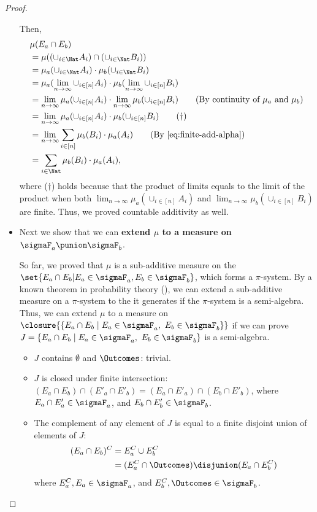 \documentclass[acmsmall,nonacm,screen,appendix]{acmart}
\begin{document}
\begin{proof}
\begin{itemize}
Then,
  \begin{align}
   &\mu(E_a \cap E_b) \notag \\
   &= \mu((\cup_{i \in \Nat} A_i) \cap (\cup_{i \in \Nat} B_i)) \notag \\
   &= \mu_a(\cup_{i \in \Nat} A_i) \cdot \mu_b(\cup_{i \in \Nat} B_i) \notag \\
   &= \mu_a(\lim_{n \to \infty} \cup_{i \in [n]} A_i) \cdot \mu_b(\lim_{n \to \infty} \cup_{i \in [n]} B_i) \notag \\
   &= \lim_{n \to \infty} \mu_a(\cup_{i \in [n]} A_i) \cdot \lim_{n \to \infty} \mu_b( \cup_{i \in [n]} B_i) \tag{By continuity of $\mu_a$ and $\mu_b$} \\
   &= \lim_{n \to \infty} \mu_a(\cup_{i \in [n]} A_i) \cdot \mu_b( \cup_{i \in [n]} B_i) \tag{$\dagger$} \\
   &= \lim_{n \to \infty} \sum_{i \in [n]}  \mu_b ( B_i) \cdot \mu_a(A_i) \tag{By~\cref{eq:finite-add-alpha}} \\
   &= \sum_{i \in \Nat}  \mu_b ( B_i) \cdot \mu_a(A_i),
  \end{align}
where ($\dagger$) holds because that the product of limits equals to the limit of
  the product when both $\lim_{n \to \infty} \mu_a(\cup_{i \in [n]} A_i)$ and
  $\lim_{n \to \infty} \mu_b( \cup_{i \in [n]} B_i)$ are finite.
  Thus, we proved countable additivity as well.



 \item
  Next we show that we can \textbf{extend $\mu$ to a measure on
  $\sigmaF_a \punion \sigmaF_b$}.

  So far, we proved that $\mu$ is a sub-additive measure on the
  $\set{E_a \cap E_b | E_a \in \sigmaF_a, E_b \in \sigmaF_b}$,
  which forms a $\pi$-system.
  By a known theorem in probability theory
  (\eg \cite[Corollary 2.5.4]{rosenthal2006first}),
  we can extend a sub-additive measure on a
   $\pi$-system to the \salgebra{} it generates if the $\pi$-system is
   a semi-algebra.
   Thus, we can extend $\mu$ to a measure on $\closure{\{E_a \cap E_b \mid E_a \in \sigmaF_a,\ E_b \in \sigmaF_b\}}$ if we can prove $J = \{E_a \cap E_b \mid E_a \in \sigmaF_a,\ E_b \in \sigmaF_b\}$ is a semi-algebra.

   \begin{itemize}
    \item $J$ contains $\emptyset$ and $\Outcomes$: trivial.
    \item $J$ is closed under finite intersection:
     $(E_a \cap E_b) \cap (E'_a \cap E'_b) = (E_a \cap E'_a) \cap (E_b \cap E'_b)$, where $E_a \cap E'_a \in \sigmaF_a$, and $E_b \cap E'_b \in \sigmaF_b$.
    \item The complement of any element of $J$ is equal to a finite disjoint
     union of elements of $J$:
     \begin{align*}
      (E_a \cap E_b)^C &= E_a^C \cup E_b^C \\
             &= (E_a^C \cap \Outcomes) \disjunion (E_a \cap E_b^C)
     \end{align*}
     where $E_a^C, E_a \in \sigmaF_a$, and $E_b^C, \Outcomes \in \sigmaF_b$.


\end{itemize}
\end{itemize}
\end{proof}
\end{document}
